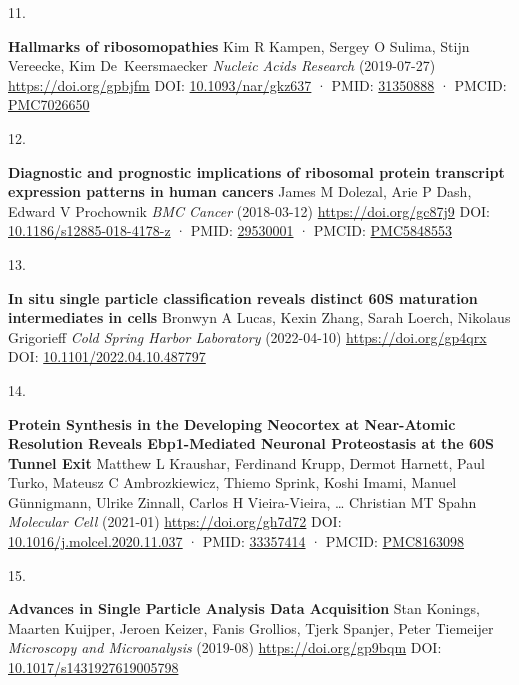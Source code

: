\documentclass[
]{article}
\newlength{\cslhangindent}
\newlength{\csllabelwidth}
\newlength{\cslentryspacingunit} %
\newenvironment{CSLReferences}[2] %
 {%
  \setlength{\parindent}{0pt}
  \ifodd #1
  \let\oldpar\par
  \def\par{\hangindent=\cslhangindent\oldpar}
  \fi
  \setlength{\parskip}{#2\cslentryspacingunit}
 }%
 {}
\newcommand{\CSLBlock}[1]{#1\hfill\break}
\newcommand{\CSLLeftMargin}[1]{\parbox[t]{\csllabelwidth}{#1}}
\newcommand{\CSLRightInline}[1]{\parbox[t]{\linewidth - \csllabelwidth}{#1}\break}
\begin{document}
\begin{CSLReferences}{0}{0}
\leavevmode{}%
\CSLLeftMargin{11. }%
\CSLRightInline{\textbf{Hallmarks of ribosomopathies}
\CSLBlock{Kim R Kampen, Sergey O Sulima, Stijn Vereecke, Kim De~Keersmaecker} \emph{Nucleic Acids Research} (2019-07-27) \url{https://doi.org/gpbjfm}
\CSLBlock{DOI: \href{https://doi.org/10.1093/nar/gkz637}{10.1093/nar/gkz637} · PMID: \href{https://www.ncbi.nlm.nih.gov/pubmed/31350888}{31350888} · PMCID: \href{https://www.ncbi.nlm.nih.gov/pmc/articles/PMC7026650}{PMC7026650}}}

\leavevmode{}%
\CSLLeftMargin{12. }%
\CSLRightInline{\textbf{Diagnostic and prognostic implications of ribosomal protein transcript expression patterns in human cancers}
\CSLBlock{James M Dolezal, Arie P Dash, Edward V Prochownik} \emph{BMC Cancer} (2018-03-12) \url{https://doi.org/gc87j9}
\CSLBlock{DOI: \href{https://doi.org/10.1186/s12885-018-4178-z}{10.1186/s12885-018-4178-z} · PMID: \href{https://www.ncbi.nlm.nih.gov/pubmed/29530001}{29530001} · PMCID: \href{https://www.ncbi.nlm.nih.gov/pmc/articles/PMC5848553}{PMC5848553}}}

\leavevmode{}%
\CSLLeftMargin{13. }%
\CSLRightInline{\textbf{ In situ single particle classification reveals distinct 60S maturation intermediates in cells}
\CSLBlock{Bronwyn A Lucas, Kexin Zhang, Sarah Loerch, Nikolaus Grigorieff} \emph{Cold Spring Harbor Laboratory} (2022-04-10) \url{https://doi.org/gp4qrx}
\CSLBlock{DOI: \href{https://doi.org/10.1101/2022.04.10.487797}{10.1101/2022.04.10.487797}}}

\leavevmode{}%
\CSLLeftMargin{14. }%
\CSLRightInline{\textbf{Protein Synthesis in the Developing Neocortex at Near-Atomic Resolution Reveals Ebp1-Mediated Neuronal Proteostasis at the 60S Tunnel Exit}
\CSLBlock{Matthew L Kraushar, Ferdinand Krupp, Dermot Harnett, Paul Turko, Mateusz C Ambrozkiewicz, Thiemo Sprink, Koshi Imami, Manuel Günnigmann, Ulrike Zinnall, Carlos H Vieira-Vieira, \ldots{} Christian MT Spahn} \emph{Molecular Cell} (2021-01) \url{https://doi.org/gh7d72}
\CSLBlock{DOI: \href{https://doi.org/10.1016/j.molcel.2020.11.037}{10.1016/j.molcel.2020.11.037} · PMID: \href{https://www.ncbi.nlm.nih.gov/pubmed/33357414}{33357414} · PMCID: \href{https://www.ncbi.nlm.nih.gov/pmc/articles/PMC8163098}{PMC8163098}}}

\leavevmode{}%
\CSLLeftMargin{15. }%
\CSLRightInline{\textbf{Advances in Single Particle Analysis Data Acquisition}
\CSLBlock{Stan Konings, Maarten Kuijper, Jeroen Keizer, Fanis Grollios, Tjerk Spanjer, Peter Tiemeijer} \emph{Microscopy and Microanalysis} (2019-08) \url{https://doi.org/gp9bqm}
\CSLBlock{DOI: \href{https://doi.org/10.1017/s1431927619005798}{10.1017/s1431927619005798}}}


\end{CSLReferences}
\end{document}
